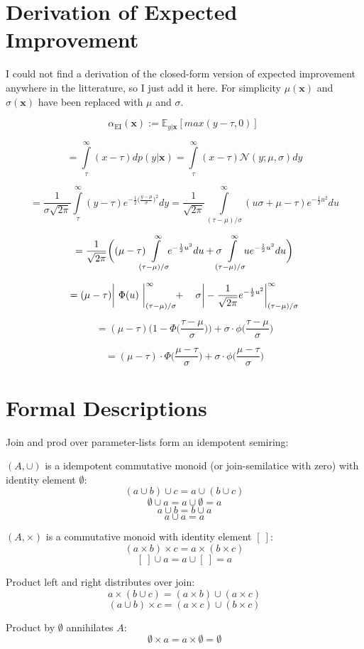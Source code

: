 \documentclass[english]{article}
\newcommand{\EI}{\operatorname{EI}}
\newcommand{\x}{\mathbf{x}}
\begin{document}
\newpage
\appendix

\section{Derivation of Expected Improvement}
\label{EI derivation}
I could not find a derivation of the closed-form version of expected improvement anywhere in the litterature, so I just add it here. For simplicity $\mu(\x)$ and $\sigma(\x)$ have been replaced with $\mu$ and $\sigma$.

$$\alpha_{\EI}(\x) := \mathbb{E}_{y|\x}[max(y-\tau, 0)]\ $$

$$= \int\limits_{\tau}^{\infty}(x-\tau)dp(y|\x) = \int\limits_{\tau}^{\infty}(x-\tau)\mathcal{N}(y;\mu,\sigma)dy$$

$$ = \frac{1}{\sigma\sqrt{2\pi}} \int\limits_{\tau}^{\infty}(y-\tau)e^{-\frac{1}{2}\big(\frac{y-\mu}{\sigma}\big)^2}dy =
\frac{1}{\sqrt{2\pi}} \int\limits_{(\tau-\mu)/\sigma}^{\infty}(u\sigma+\mu-\tau)e^{-\frac{1}{2}u^2}du$$

$$=\frac{1}{\sqrt{2\pi}}\bigg((\mu-\tau) \mkern-12mu \int\limits_{(\tau-\mu)/\sigma}^{\infty} \mkern-10mu e^{-\frac{1}{2}u^2}du + \sigma \mkern-12mu \int\limits_{(\tau-\mu)/\sigma}^{\infty} \mkern-10mu u e^{-\frac{1}{2}u^2}du \bigg)$$

$$=(\mu-\tau)\bigg|\ \Phi(u)\ \bigg|_{(\tau-\mu)/\sigma}^{\infty} \mkern-6mu + \ \ \ \sigma\bigg|-\frac{1}{\sqrt{2\pi}}e^{-\frac{1}{2}u^2}\bigg|_{(\tau-\mu)/\sigma}^{\infty}$$

$$=(\mu-\tau)\bigg(1-\Phi\bigg(\frac{\tau-\mu}{\sigma}\bigg)\bigg) + \sigma \cdot \phi \bigg(\frac{\tau-\mu}{\sigma}\bigg)$$

$$ = (\mu - \tau) \cdot \Phi \bigg(\frac{\mu-\tau}{\sigma}\bigg) + \sigma \cdot \phi \bigg(\frac{\mu-\tau}{\sigma}\bigg)$$


\section{Formal Descriptions}
Join and prod over parameter-lists form an idempotent semiring:

$(A, \cup)$ is a idempotent commutative monoid (or join-semilatice with zero) with identity element $\emptyset$:
$$(a \cup b) \cup c = a \cup (b \cup c)$$
$$\emptyset \cup a = a \cup \emptyset = a$$
$$a \cup b = b \cup a$$
$$a \cup a = a$$

$(A, \times)$ is a commutative monoid with identity element $[\ ]$:
$$(a \times b) \times c = a \times (b \times c)$$
$$[\ ] \cup a = a \cup [\ ] = a$$

Product left and right distributes over join:
$$a\times(b \cup c) = (a\times b) \cup (a\times c)$$
$$(a \cup b)\times c = (a\times c) \cup (b\times c)$$

Product by $\emptyset$ annihilates $A$:
$$\emptyset \times a = a \times \emptyset = \emptyset$$


\printbibliography


 
\end{document}

